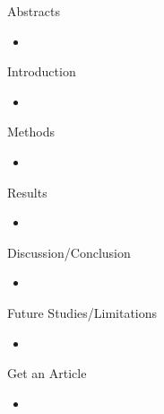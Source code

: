 \documentclass[
  ignorenonframetext,
]{beamer}
\providecommand{\tightlist}{%
  \setlength{\itemsep}{0pt}\setlength{\parskip}{0pt}}
\begin{document}
\begin{frame}{Abstracts}
\label{abstracts}
\begin{itemize}
\tightlist
\item
\end{itemize}
\end{frame}

\begin{frame}{Introduction}
\label{introduction}
\begin{itemize}
\tightlist
\item
\end{itemize}
\end{frame}

\begin{frame}{Methods}
\label{methods}
\begin{itemize}
\tightlist
\item
\end{itemize}
\end{frame}

\begin{frame}{Results}
\label{results}
\begin{itemize}
\tightlist
\item
\end{itemize}
\end{frame}

\begin{frame}{Discussion/Conclusion}
\label{discussionconclusion}
\begin{itemize}
\tightlist
\item
\end{itemize}
\end{frame}

\begin{frame}{Future Studies/Limitations}
\label{future-studieslimitations}
\begin{itemize}
\tightlist
\item
\end{itemize}
\end{frame}

\begin{frame}{Get an Article}
\label{get-an-article}
\begin{itemize}
\tightlist
\item
\end{itemize}
\end{frame}
\end{document}
